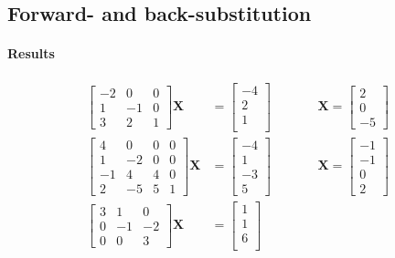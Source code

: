 \documentclass[a4paper,11]{article}
\begin{document}
\subsection{Forward- and back-substitution}

\paragraph{Results}

\[
\begin{alignedat}{2}
\begin{bmatrix}
	-2 & 0 & 0\\
	1 & -1 & 0 \\
	3 & 2 & 1
\end{bmatrix}\mathbf{X} &= 
\begin{bmatrix} 
	-4 \\
	2 \\
	1 \\
\end{bmatrix} \qquad& &\mathbf{X} = 
\begin{bmatrix} 
	2 \\
	0 \\
	-5
\end{bmatrix} \\
\begin{bmatrix}
	4 & 0 & 0 & 0\\
	1 & -2 & 0 & 0\\
	-1 & 4 & 4 & 0\\
	2 & -5 & 5 & 1
\end{bmatrix}\mathbf{X} &= 
\begin{bmatrix} 
	-4 \\
	1 \\
	-3 \\
	5
\end{bmatrix} \qquad& &\mathbf{X} = 
\begin{bmatrix} 
	-1 \\
	-1 \\
	0 \\
	2
\end{bmatrix} \\
\begin{bmatrix}
	3 & 1 & 0\\
	0 & -1 & -2 \\
	0 & 0 & 3
\end{bmatrix}\mathbf{X} &= 
\begin{bmatrix} 
	1 \\
	1 \\
	6 \\

\end{bmatrix}
\end{alignedat}\]
\end{document}
